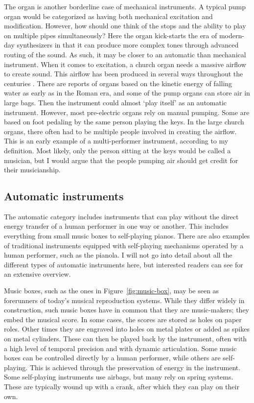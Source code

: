 The organ is another borderline case of mechanical instruments. A typical pump organ would be categorized as having both mechanical excitation and modification. However, how should one think of the stops and the ability to play on multiple pipes simultaneously? Here the organ kick-starts the era of modern-day synthesizers in that it can produce more complex tones through advanced routing of the sound. As such, it may be closer to an automatic than mechanical instrument. When it comes to excitation, a church organ needs a massive airflow to create sound. This airflow has been produced in several ways throughout the centuries \citep{bush_organ_2004}. There are reports of organs based on the kinetic energy of falling water as early as in the Roman era, and some of the pump organs can store air in large bags. Then the instrument could almost `play itself' as an automatic instrument. However, most pre-electric organs rely on manual pumping. Some are based on foot pedaling by the same person playing the keys. In the large church organs, there often had to be multiple people involved in creating the airflow. This is an early example of a multi-performer instrument, according to my definition. Most likely, only the person sitting at the keys would be called a musician, but I would argue that the people pumping air should get credit for their musicianship.


\subsection{Automatic instruments}\label{sec:automatic}

The automatic category includes instruments that can play without the direct energy transfer of a human performer in one way or another. This includes everything from small music boxes to self-playing pianos. There are also examples of traditional instruments equipped with self-playing mechanisms operated by a human performer, such as the pianola. I will not go into detail about all the different types of automatic instruments here, but interested readers can see \citet{bowers_encyclopedia_1972} for an extensive overview.

Music boxes, such as the ones in Figure~\ref{fig:music-box}, may be seen as  forerunners of today's musical reproduction systems. While they differ widely in construction, such music boxes have in common that they are music-makers; they embed the musical score. In some cases, the scores are stored as holes on paper roles. Other times they are engraved into holes on metal plates or added as spikes on metal cylinders. These can then be played back by the instrument, often with a high level of temporal precision and with dynamic articulation. Some music boxes can be controlled directly by a human performer, while others are self-playing. This is achieved through the preservation of energy in the instrument. Some self-playing instruments use airbags, but many rely on spring systems. These are typically wound up with a crank, after which they can play on their own.

